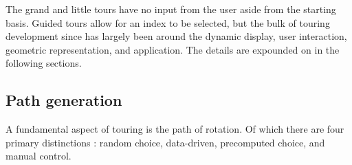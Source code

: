\documentclass{monashthesis}
\begin{document}
The grand and little tours have no input from the user aside from the
starting basis. Guided tours allow for an index to be selected, but the
bulk of touring development since has largely been around the dynamic
display, user interaction, geometric representation, and application.
The details are expounded on in the following sections.

\subsection{Path generation}\label{sec:path_generation}

A fundamental aspect of touring is the path of rotation. Of which there
are four primary distinctions \autocite{buja_computational_2005}: random
choice, data-driven, precomputed choice, and manual control.
\end{document}
